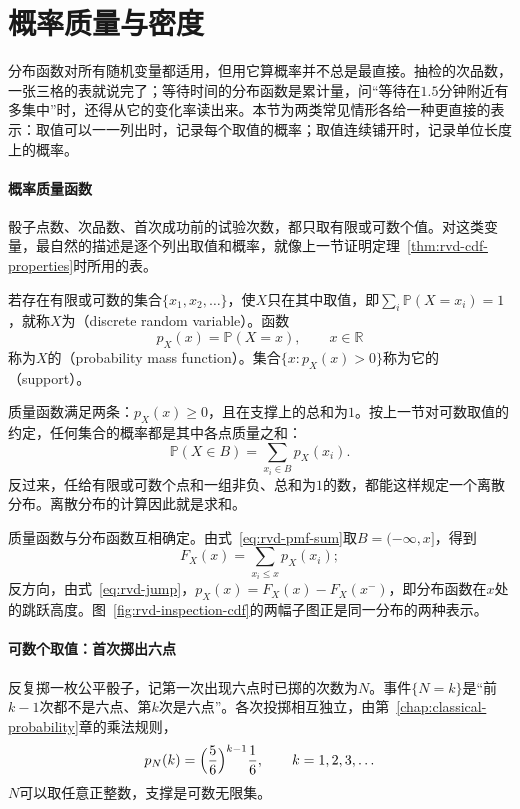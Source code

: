 \section{概率质量与密度}
\label{sec:rvd-mass-density}

分布函数对所有随机变量都适用，但用它算概率并不总是最直接。抽检的次品数，一张三格的表就说完了；等待时间的分布函数是累计量，问“等待在$1.5$分钟附近有多集中”时，还得从它的变化率读出来。本节为两类常见情形各给一种更直接的表示：取值可以一一列出时，记录每个取值的概率；取值连续铺开时，记录单位长度上的概率。

\paragraph{概率质量函数}
骰子点数、次品数、首次成功前的试验次数，都只取有限或可数个值。对这类变量，最自然的描述是逐个列出取值和概率，就像上一节证明定理~\ref{thm:rvd-cdf-properties}时所用的表。

\begin{definition}[概率质量函数]
\label{def:rvd-pmf}
若存在有限或可数的集合$\{x_1,x_2,\dots\}$，使$X$只在其中取值，即$\sum_i\mathbb{P}(X=x_i)=1$，就称$X$为（discrete random variable）。函数
\begin{equation}
  p_X(x)=\mathbb{P}(X=x),\qquad x\in\mathbb{R}
  \label{eq:rvd-pmf}
\end{equation}
称为$X$的（probability mass function）。集合$\{x:p_X(x)>0\}$称为它的（support）。
\end{definition}

质量函数满足两条：$p_X(x)\geq0$，且在支撑上的总和为$1$。按上一节对可数取值的约定，任何集合的概率都是其中各点质量之和：
\begin{equation}
  \mathbb{P}(X\in B)=\sum_{x_i\in B}p_X(x_i).
  \label{eq:rvd-pmf-sum}
\end{equation}
反过来，任给有限或可数个点和一组非负、总和为$1$的数，都能这样规定一个离散分布。离散分布的计算因此就是求和。

质量函数与分布函数互相确定。由式~\eqref{eq:rvd-pmf-sum}取$B=(-\infty,x]$，得到
\begin{equation}
  F_X(x)=\sum_{x_i\leq x}p_X(x_i);
  \label{eq:rvd-pmf-to-cdf}
\end{equation}
反方向，由式~\eqref{eq:rvd-jump}，$p_X(x)=F_X(x)-F_X(x^{-})$，即分布函数在$x$处的跳跃高度。图~\ref{fig:rvd-inspection-cdf}的两幅子图正是同一分布的两种表示。

\paragraph{可数个取值：首次掷出六点}
反复掷一枚公平骰子，记第一次出现六点时已掷的次数为$N$。事件$\{N=k\}$是“前$k-1$次都不是六点、第$k$次是六点”。各次投掷相互独立，由第~\ref{chap:classical-probability}章的乘法规则，
\begin{equation}
  p_N(k)=\Bigl(\frac56\Bigr)^{k-1}\frac16,\qquad k=1,2,3,\dots
  \label{eq:rvd-first-six}
\end{equation}
$N$可以取任意正整数，支撑是可数无限集。

